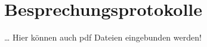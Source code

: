 \section{Besprechungsprotokolle}
\ldots
Hier können auch pdf Dateien eingebunden werden!
\newpage



